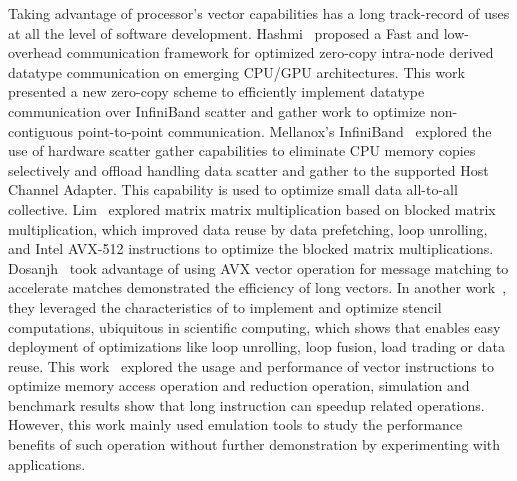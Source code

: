 \documentclass[conference]{IEEEtran}
\begin{document}
Taking advantage of processor's vector capabilities has a long track-record of
uses at all the level of software development.
Hashmi~\cite{ASHMI20201} proposed a Fast and low-overhead communication framework
for optimized zero-copy intra-node derived datatype communication on emerging CPU/GPU architectures.
%
This work~\cite{Berlin04} presented a new
zero-copy scheme to efficiently implement datatype communication over InfiniBand
scatter and gather work to optimize non-contiguous point-to-point communication.
%
Mellanox's InfiniBand~\cite{Gainaru2016} explored the use of hardware scatter
gather capabilities to eliminate CPU memory copies selectively and offload handling
data scatter and gather to the supported Host Channel Adapter. This capability is
used to optimize small data all-to-all collective.
Lim~\cite{Lim2018} explored matrix matrix multiplication based on blocked matrix multiplication,
which improved data reuse by data prefetching, loop unrolling, and Intel AVX-512 instructions to optimize
the blocked matrix multiplications.
%
Dosanjh~\cite{tag-match} took advantage of using AVX vector operation for
\mpi message matching to accelerate matches demonstrated the efficiency
of long vectors.
In another work~\cite{sve-stencil}, they leveraged the characteristics of \sve to
implement and optimize stencil computations, ubiquitous in scientific computing,
which shows that \sve enables easy deployment of optimizations like loop unrolling,
loop fusion, load trading or data reuse.
%
This work~\cite{dongsve} explored the usage and performance of \sve vector instructions to optimize
memory access operation and reduction operation, simulation and benchmark results show that \sve
long instruction can speedup related operations. However, this work mainly used emulation tools to
study the performance benefits of such operation without further demonstration by experimenting
with applications.
%
\end{document}
